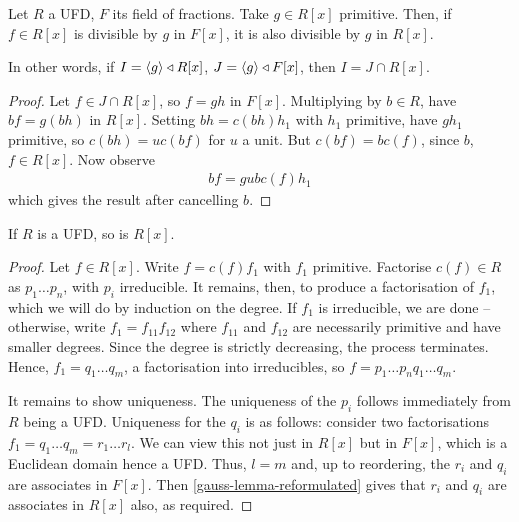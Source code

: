 \documentclass{../../template/note}
\begin{document}
    \begin{proposition}
        \label{gauss-lemma-reformulated}
        Let $R$ a UFD, $F$ its field of fractions. Take $g \in R[x]$ primitive. Then, if $f \in R[x]$ is divisible by $g$ in $F[x]$, it is also divisible by $g$ in $R[x]$.

        In other words, if $I = \left \langle g \right \rangle \triangleleft R[x]$, $J = \left \langle g \right \rangle \triangleleft F[x]$, then $I = J \cap R[x]$.
    \end{proposition}
    
    \begin{proof}
        Let $f \in J \cap R[x]$, so $f = gh$ in $F[x]$. Multiplying by $b \in R$, have $bf = g(bh)$ in $R[x]$. Setting $bh = c(bh)h_1$ with $h_1$ primitive, have $gh_1$ primitive, so $c(bh) = uc(bf)$ for $u$ a unit. But $c(bf) = bc(f)$, since $b$, $f \in R[x]$. Now observe
        \begin{align*}
            bf = gubc(f)h_1
        \end{align*}
        which gives the result after cancelling $b$.        
    \end{proof}
    
    \begin{theorem}
        If $R$ is a UFD, so is $R[x]$.
    \end{theorem}
    
    \begin{proof}
        Let $f \in R[x]$. Write $f = c(f)f_1$ with $f_1$ primitive. Factorise $c(f) \in R$ as $p_1 \dots p_n$, with $p_i$ irreducible. It remains, then, to produce a factorisation of $f_1$, which we will do by induction on the degree. If $f_1$ is irreducible, we are done -- otherwise, write $f_1 = f_{11}f_{12}$ where $f_{11}$ and $f_{12}$ are necessarily primitive and have smaller degrees. Since the degree is strictly decreasing, the process terminates. Hence, $f_1 = q_1 \dots q_m$, a factorisation into irreducibles, so $f = p_1 \dots p_n q_1 \dots q_m$.

        It remains to show uniqueness. The uniqueness of the $p_i$ follows immediately from $R$ being a UFD. Uniqueness for the $q_i$ is as follows: consider two factorisations $f_1 = q_1 \dots q_m = r_1 \dots r_l$. We can view this not just in $R[x]$ but in $F[x]$, which is a Euclidean domain hence a UFD. Thus, $l=m$ and, up to reordering, the $r_i$ and $q_i$ are associates in $F[x]$. Then \cref{gauss-lemma-reformulated} gives that $r_i$ and $q_i$ are associates in $R[x]$ also, as required.
    \end{proof}
    
\end{document}
